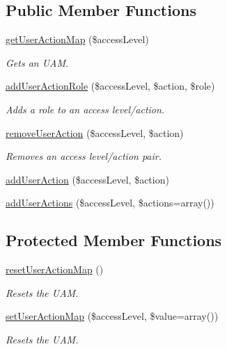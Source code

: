 \subsection*{Public Member Functions}
\begin{DoxyCompactItemize}
\item 
\hyperlink{classCXLUserActionBehavior_add454aad5b6c4da4c505cfddc95b5c28}{getUserActionMap} (\$accessLevel)
\begin{DoxyCompactList}\small\item\em Gets an UAM. \item\end{DoxyCompactList}\item 
\hyperlink{classCXLUserActionBehavior_a45b0d25829a9c6dc423327ad66d731ab}{addUserActionRole} (\$accessLevel, \$action, \$role)
\begin{DoxyCompactList}\small\item\em Adds a role to an access level/action. \item\end{DoxyCompactList}\item 
\hyperlink{classCXLUserActionBehavior_a94aadec855a8f2a8c11ad692e944fbab}{removeUserAction} (\$accessLevel, \$action)
\begin{DoxyCompactList}\small\item\em Removes an access level/action pair. \item\end{DoxyCompactList}\item 
\hyperlink{classCXLUserActionBehavior_ad0ba36d866855d0f825be3ee705752dc}{addUserAction} (\$accessLevel, \$action)
\item 
\hyperlink{classCXLUserActionBehavior_a0674340deb38ba1bdd56925fde80857c}{addUserActions} (\$accessLevel, \$actions=array())
\end{DoxyCompactItemize}
\subsection*{Protected Member Functions}
\begin{DoxyCompactItemize}
\item 
\hyperlink{classCXLUserActionBehavior_a7a9cb51ff46e200b6475678ac407a8b5}{resetUserActionMap} ()
\begin{DoxyCompactList}\small\item\em Resets the UAM. \item\end{DoxyCompactList}\item 
\hyperlink{classCXLUserActionBehavior_ab596b5f38307ae814ca5d0757babf136}{setUserActionMap} (\$accessLevel, \$value=array())
\begin{DoxyCompactList}\small\item\em Resets the UAM. \item\end{DoxyCompactList}\end{DoxyCompactItemize}
